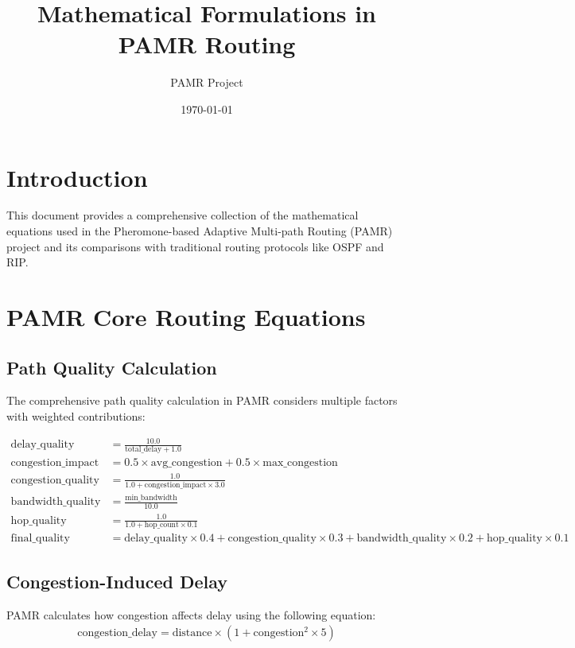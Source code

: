 \documentclass{article}
\title{Mathematical Formulations in PAMR Routing}
\author{PAMR Project}
\date{\today}
\begin{document}
\maketitle

\section{Introduction}
This document provides a comprehensive collection of the mathematical equations used in the Pheromone-based Adaptive Multi-path Routing (PAMR) project and its comparisons with traditional routing protocols like OSPF and RIP.

\section{PAMR Core Routing Equations}

\subsection{Path Quality Calculation}
The comprehensive path quality calculation in PAMR considers multiple factors with weighted contributions:

\begin{align}
\text{delay\_quality} &= \frac{10.0}{\text{total\_delay} + 1.0} \\
\text{congestion\_impact} &= 0.5 \times \text{avg\_congestion} + 0.5 \times \text{max\_congestion} \\
\text{congestion\_quality} &= \frac{1.0}{1.0 + \text{congestion\_impact} \times 3.0} \\
\text{bandwidth\_quality} &= \frac{\text{min\_bandwidth}}{10.0} \\
\text{hop\_quality} &= \frac{1.0}{1.0 + \text{hop\_count} \times 0.1} \\
\text{final\_quality} &= \text{delay\_quality} \times 0.4 + \text{congestion\_quality} \times 0.3 + \text{bandwidth\_quality} \times 0.2 + \text{hop\_quality} \times 0.1
\end{align}

\subsection{Congestion-Induced Delay}
PAMR calculates how congestion affects delay using the following equation:
\begin{align}
\text{congestion\_delay} = \text{distance} \times (1 + \text{congestion}^2 \times 5)
\end{align}
\end{document}
